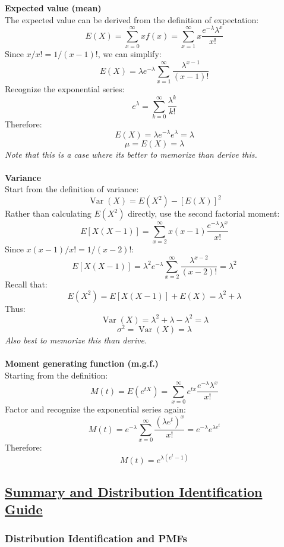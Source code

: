 ﻿\documentclass[12pt]{article}
\begin{document}
\textbf{Expected value (mean)}\\
The expected value can be derived from the definition of expectation:
\[
E(X)=\sum_{x=0}^{\infty}xf(x)=\sum_{x=1}^{\infty}x\frac{e^{-\lambda}\lambda^x}{x!}
\]
Since \(x/x!=1/(x-1)!\), we can simplify:
\[
E(X)=\lambda e^{-\lambda}\sum_{x=1}^{\infty}\frac{\lambda^{x-1}}{(x-1)!}
\]
Recognize the exponential series:
\[
e^\lambda=\sum_{k=0}^{\infty}\frac{\lambda^k}{k!}
\]
Therefore:
\[
E(X)=\lambda e^{-\lambda}e^\lambda=\lambda
\]
\[
\boxed{\mu=E(X)=\lambda}
\]
\textit{Note that this is a case where its better to memorize than derive this.}\\\\
\textbf{Variance}\\
Start from the definition of variance:
\[
\operatorname{Var}(X)=E(X^2)-[E(X)]^2
\]
Rather than calculating \(E(X^2)\) directly, use the second factorial moment:
\[
E[X(X-1)]=\sum_{x=2}^{\infty}x(x-1)\frac{e^{-\lambda}\lambda^x}{x!}
\]
Since \(x(x-1)/x!=1/(x-2)!\):
\[
E[X(X-1)]=\lambda^2e^{-\lambda}\sum_{x=2}^{\infty}\frac{\lambda^{x-2}}{(x-2)!}=\lambda^2
\]
Recall that:
\[
E(X^2)=E[X(X-1)]+E(X)=\lambda^2+\lambda
\]
Thus:
\[
\operatorname{Var}(X)=\lambda^2+\lambda-\lambda^2=\lambda
\]
\[
\boxed{\sigma^2=\operatorname{Var}(X)=\lambda}
\]
\textit{Also best to memorize this than derive.}\\\\
\textbf{Moment generating function (m.g.f.)}\\
Starting from the definition:
\[
M(t)=E(e^{tX})=\sum_{x=0}^{\infty}e^{tx}\frac{e^{-\lambda}\lambda^x}{x!}
\]
Factor and recognize the exponential series again:
\[
M(t)=e^{-\lambda}\sum_{x=0}^{\infty}\frac{(\lambda e^t)^x}{x!}
=e^{-\lambda}e^{\lambda e^t}
\]
Therefore:
\[
\boxed{M(t)=e^{\lambda(e^t-1)}}
\]
\subsection*{\underline{Summary and Distribution Identification Guide}}

\subsubsection*{Distribution Identification and PMFs}

\renewcommand{\arraystretch}{1.6}
\setlength{\tabcolsep}{5pt}
\end{document}
